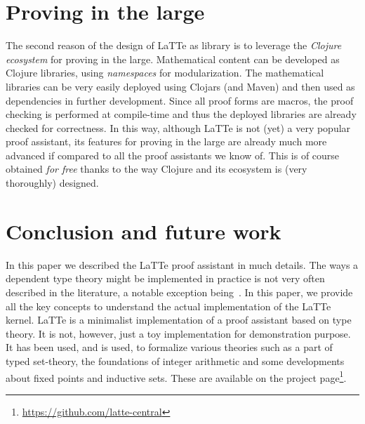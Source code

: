 \documentclass{styles/sig-alternate-05-2015}
\begin{document}
\section*{Proving in the large} The second reason of the design of LaTTe as library is to leverage the \emph{Clojure ecosystem}
for proving in the large. Mathematical content can be developed as Clojure libraries, using \emph{namespaces} for modularization.
The mathematical libraries can be very easily deployed using Clojars (and Maven) and then used as dependencies in further
development. Since all proof forms are macros, the proof checking is performed at compile-time and thus the deployed libraries
are already checked for correctness. In this way, although LaTTe is not (yet) a very popular proof assistant, its features
for proving in the large are already much more advanced if compared to all the proof assistants we know of. This is of course
obtained \emph{for free} thanks to the way Clojure and its ecosystem is (very thoroughly) designed.

\section{Conclusion and future work}

In this paper we described the LaTTe proof assistant in much details. The ways a dependent type theory might be implemented
in practice is not very often described in the literature, a notable exception being~\cite{DBLP:journals/fuin/LohMS10}. In this paper, we provide all the key concepts to understand the actual implementation of the LaTTe kernel.
LaTTe is a minimalist implementation of a proof assistant based on type theory.
It is not, however, just a toy implementation for demonstration purpose. It has been used, and is used, to formalize
various theories such as a part of typed set-theory, the foundations of integer arithmetic and some developments about
fixed points and inductive sets. These are available on the project page\footnote{\url{https://github.com/latte-central}}.
\end{document}
